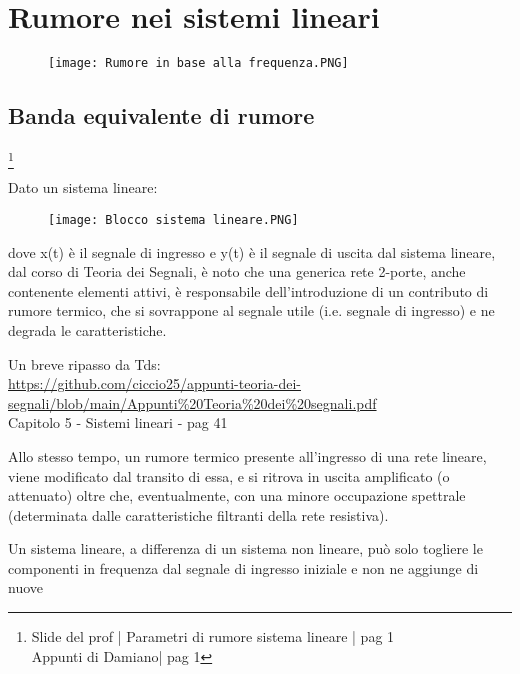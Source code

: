 \chapter{Rumore nei sistemi lineari}

\begin{figure}[h]
    \centering
    \texttt{[image: Rumore in base alla frequenza.PNG]}
\end{figure}

\newpage 

\section{Banda equivalente di rumore}
\footnote{Slide del prof | Parametri di rumore sistema lineare | pag 1 \\  
Appunti di Damiano| pag 1} 

Dato un sistema lineare: 

\begin{figure}[h]
    \centering
    \texttt{[image: Blocco sistema lineare.PNG]}
\end{figure}

dove x(t) è il segnale di ingresso e y(t) è il segnale di uscita dal sistema lineare, 
dal corso di Teoria dei Segnali, è noto che una generica rete 2-porte, anche contenente elementi attivi, 
è responsabile dell'introduzione di un contributo di rumore termico, 
che si sovrappone al segnale utile (i.e. segnale di ingresso) e ne degrada le caratteristiche. \newline 

\begin{tcolorbox}
    Un breve ripasso da Tds: \\
    \url{https://github.com/ciccio25/appunti-teoria-dei-segnali/blob/main/Appunti%20Teoria%20dei%20segnali.pdf} \\
    Capitolo 5 - Sistemi lineari - pag 41
\end{tcolorbox}

Allo stesso tempo, un rumore termico presente all'ingresso di una rete lineare, 
viene modificato dal transito di essa, e si ritrova in uscita amplificato (o attenuato) 
oltre che, eventualmente, con una minore occupazione spettrale (determinata dalle caratteristiche filtranti della rete resistiva). \newline 

\begin{tcolorbox}
    Un sistema lineare, a differenza di un sistema non lineare, può solo togliere le componenti in frequenza dal segnale di ingresso iniziale e non ne aggiunge di nuove
\end{tcolorbox}

